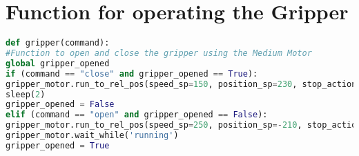 \section{Function for operating the Gripper}
\vspace{-7mm}
\begin{lstlisting}[language={python}, caption={Function for operating the Gripper}, label=gripper]
def gripper(command):
#Function to open and close the gripper using the Medium Motor
global gripper_opened
if (command == "close" and gripper_opened == True):
gripper_motor.run_to_rel_pos(speed_sp=150, position_sp=230, stop_action = 'brake') # closing
sleep(2)
gripper_opened = False
elif (command == "open" and gripper_opened == False):
gripper_motor.run_to_rel_pos(speed_sp=250, position_sp=-210, stop_action = 'brake') #opening
gripper_motor.wait_while('running')
gripper_opened = True
\end{lstlisting}

